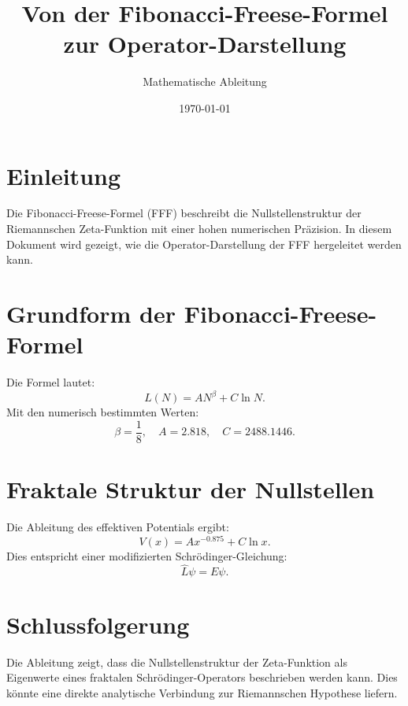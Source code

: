 \documentclass[a4paper,12pt]{article}
\title{Von der Fibonacci-Freese-Formel zur Operator-Darstellung}
\author{Mathematische Ableitung}
\date{\today}
\begin{document}
\maketitle

\section{Einleitung}
Die Fibonacci-Freese-Formel (FFF) beschreibt die Nullstellenstruktur der Riemannschen Zeta-Funktion mit einer hohen numerischen Präzision. In diesem Dokument wird gezeigt, wie die Operator-Darstellung der FFF hergeleitet werden kann.

\section{Grundform der Fibonacci-Freese-Formel}
Die Formel lautet:
\begin{equation}
L(N) = A N^\beta + C \ln N.
\end{equation}
Mit den numerisch bestimmten Werten:
\begin{equation}
\beta = \frac{1}{8}, \quad A = 2.818, \quad C = 2488.1446.
\end{equation}

\section{Fraktale Struktur der Nullstellen}
Die Ableitung des effektiven Potentials ergibt:
\begin{equation}
V(x) = A x^{-0.875} + C \ln x.
\end{equation}
Dies entspricht einer modifizierten Schrödinger-Gleichung:
\begin{equation}
\hat{L} \psi = E \psi.
\end{equation}

\section{Schlussfolgerung}
Die Ableitung zeigt, dass die Nullstellenstruktur der Zeta-Funktion als Eigenwerte eines fraktalen Schrödinger-Operators beschrieben werden kann. Dies könnte eine direkte analytische Verbindung zur Riemannschen Hypothese liefern.
\end{document}
